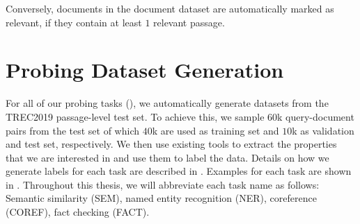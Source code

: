Conversely, documents in the document dataset are automatically marked as relevant, if they contain at least $1$ relevant passage.

\section{Probing Dataset Generation}
\label{sec:dataset_gen}
For all of our probing tasks (), we automatically generate datasets from the TREC2019 passage-level test set. To achieve this, we sample $60$k query-document pairs from the test set of which $40$k are used as training set and $10$k as validation and test set, respectively. We then use existing tools to extract the properties that we are interested in and use them to label the data. Details on how we generate labels for each task are described in . Examples for each task are shown in . Throughout this thesis, we will abbreviate each task name as follows: Semantic similarity (SEM), named entity recognition (NER), coreference (COREF), fact checking (FACT).

